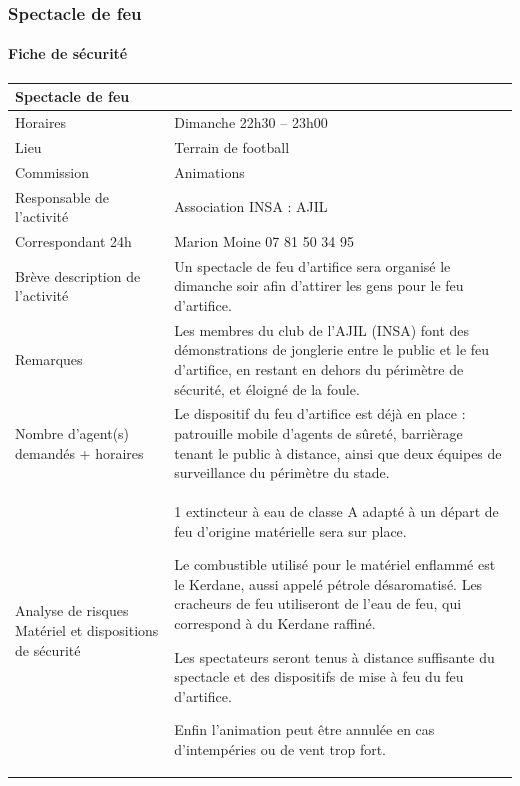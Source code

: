 \documentclass[hidelinks, paper=a4, fontsize=13pt]{report}
\begin{document}
\newpage

\subsubsection{Spectacle de feu}

\paragraph{Fiche de sécurité}
\begin{center}

\begin{tabular}{ | p{6cm} | p{10cm} | }
\hline
	\multicolumn{2}{|l|}{Spectacle de feu}  \\ \hline
	Horaires & Dimanche 22h30 – 23h00 \\ \hline
	Lieu & Terrain de football \\ \hline
	Commission & Animations \\ \hline
	Responsable de l'activité & Association INSA : AJIL \\ \hline
	Correspondant 24h & Marion Moine 07 81 50 34 95 \\ \hline
	Brève description de l'activité & Un spectacle de feu d’artifice sera organisé le dimanche soir afin d’attirer les gens pour le feu d’artifice. \\ \hline
	Remarques & Les membres du club de l’AJIL (INSA) font des démonstrations de jonglerie entre le public et le feu d’artifice, en restant en dehors du périmètre de sécurité, et éloigné de la foule. \\ \hline
	Nombre d’agent(s) demandés + horaires
 & Le dispositif du feu d’artifice est déjà en place : patrouille mobile d’agents de sûreté, barrièrage tenant le public à distance, ainsi que deux équipes de surveillance du périmètre du stade. \\ \hline
	Analyse de risques
Matériel et dispositions de sécurité & 1 extincteur à eau de classe A adapté à un départ de feu d'origine matérielle sera sur place.

Le combustible utilisé pour le matériel enflammé est le Kerdane, aussi appelé pétrole désaromatisé. Les cracheurs de feu utiliseront de l'eau de feu, qui correspond à du Kerdane raffiné. 

Les spectateurs seront tenus à distance suffisante du spectacle et des dispositifs de mise à feu du feu d’artifice.

Enfin l’animation peut être annulée en cas d’intempéries ou de vent trop fort. \\ \hline
\end{tabular}
\end{center}
\end{document}
